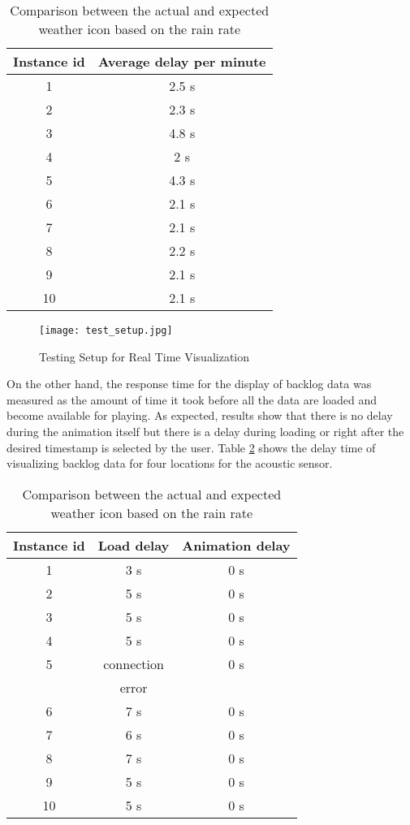 \begin{table}
\caption{Comparison between the actual and expected weather icon based on the rain rate}
\centering
\begin{tabular}{c c}%
\hline\hline
Instance id & Average delay per minute \\ [0.5ex]
\hline
1	& 2.5 s \\
2	& 2.3 s \\
3	& 4.8 s \\
4	& 2 s \\
5	& 4.3 s \\
6	& 2.1 s \\
7	& 2.1 s \\
8	& 2.2 s \\
9	& 2.1 s \\
10	& 2.1 s \\ [1ex]
\hline
\end{tabular}
\label{table:delay}
\end{table}
\bigskip

\begin{figure}
    \centering
        \texttt{[image: test\_setup.jpg]}
    \caption{Testing Setup for Real Time Visualization}
    \label{fig:test_setup}
\end{figure}
\bigskip

On the other hand, the response time for the display of backlog data was measured as the amount of time it took before all the data are loaded and become available for playing. As expected, results show that there is no delay during the animation itself but there is a delay during loading or right after the desired timestamp is selected by the user. Table \ref{table:delay_backlog} shows the delay time of visualizing backlog data for four locations for the acoustic sensor.

\begin{table}
\caption{Comparison between the actual and expected weather icon based on the rain rate}
\centering
\begin{tabular}{c c c }%
\hline\hline
Instance id & Load delay & Animation delay \\ [0.5ex]
\hline
1	& 3 s & 0 s \\
2	& 5 s & 0 s \\
3	& 5 s & 0 s \\
4	& 5 s & 0 s \\
5	& connection & 0 s \\
  & error & \\
6	& 7 s & 0 s \\
7	& 6 s & 0 s \\
8	& 7 s & 0 s \\
9	& 5 s & 0 s \\
10	& 5 s & 0 s \\ [1ex]
\hline
\end{tabular}
\label{table:delay_backlog}
\end{table}
\bigskip

